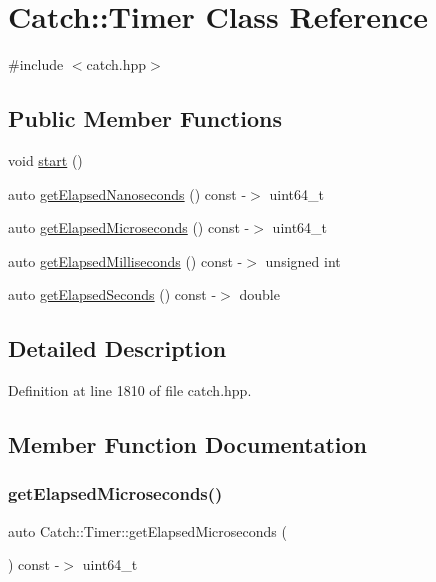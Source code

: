 \hypertarget{class_catch_1_1_timer}{}\section{Catch\+:\+:Timer Class Reference}
\label{class_catch_1_1_timer}


{\ttfamily \#include $<$catch.\+hpp$>$}

\subsection*{Public Member Functions}
\begin{DoxyCompactItemize}
\item 
void \mbox{\hyperlink{class_catch_1_1_timer_a0a56e879e43f36c102bf9ea8b5fc8b72}{start}} ()
\item 
auto \mbox{\hyperlink{class_catch_1_1_timer_a57be5d17ca868a2d6fb1eea84de665cf}{get\+Elapsed\+Nanoseconds}} () const -\/$>$ uint64\+\_\+t
\item 
auto \mbox{\hyperlink{class_catch_1_1_timer_a545de17a61a6fee1dbe3de5b0723e5fa}{get\+Elapsed\+Microseconds}} () const -\/$>$ uint64\+\_\+t
\item 
auto \mbox{\hyperlink{class_catch_1_1_timer_a30aaf458dbb59dd8ac8971c9c62e0eac}{get\+Elapsed\+Milliseconds}} () const -\/$>$ unsigned int
\item 
auto \mbox{\hyperlink{class_catch_1_1_timer_a065e37e3c9eb16bd4dcf41971d8deedc}{get\+Elapsed\+Seconds}} () const -\/$>$ double
\end{DoxyCompactItemize}


\subsection{Detailed Description}


Definition at line 1810 of file catch.\+hpp.



\subsection{Member Function Documentation}
\mbox{\label{class_catch_1_1_timer_a545de17a61a6fee1dbe3de5b0723e5fa}} 
\subsubsection{\texorpdfstring{get\+Elapsed\+Microseconds()}{getElapsedMicroseconds()}}
{\footnotesize\ttfamily auto Catch\+::\+Timer\+::get\+Elapsed\+Microseconds (\begin{DoxyParamCaption}{ }\end{DoxyParamCaption}) const -\/$>$  uint64\+\_\+t}

